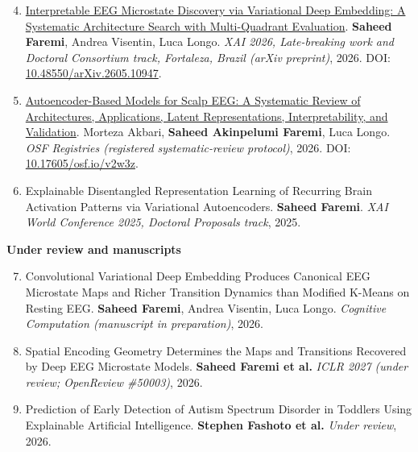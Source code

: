 \documentclass[11pt]{article}
\begin{document}
\begin{enumerate}
  \setcounter{enumi}{3}
  \setlength{\itemsep}{2pt}
  \item \href{https://arxiv.org/abs/2605.10947}{Interpretable EEG Microstate Discovery via Variational Deep Embedding: A Systematic Architecture Search with Multi-Quadrant Evaluation}.\newline
  \textbf{Saheed Faremi}, Andrea Visentin, Luca Longo.\newline
  \emph{XAI 2026, Late-breaking work and Doctoral Consortium track, Fortaleza, Brazil (arXiv preprint)}, 2026. DOI: \href{https://doi.org/10.48550/arXiv.2605.10947}{10.48550/arXiv.2605.10947}.

  \item \href{https://osf.io/v2w3z}{Autoencoder-Based Models for Scalp EEG: A Systematic Review of Architectures, Applications, Latent Representations, Interpretability, and Validation}.\newline
  Morteza Akbari, \textbf{Saheed Akinpelumi Faremi}, Luca Longo.\newline
  \emph{OSF Registries (registered systematic-review protocol)}, 2026. DOI: \href{https://doi.org/10.17605/osf.io/v2w3z}{10.17605/osf.io/v2w3z}.

  \item Explainable Disentangled Representation Learning of Recurring Brain Activation Patterns via Variational Autoencoders.\newline
  \textbf{Saheed Faremi}.\newline
  \emph{XAI World Conference 2025, Doctoral Proposals track}, 2025.
\end{enumerate}
\vspace{5pt}
\noindent\textbf{Under review and manuscripts}\par
\vspace{2pt}
\begin{enumerate}
  \setcounter{enumi}{6}
  \setlength{\itemsep}{2pt}
  \item Convolutional Variational Deep Embedding Produces Canonical EEG Microstate Maps and Richer Transition Dynamics than Modified K-Means on Resting EEG.\newline
  \textbf{Saheed Faremi}, Andrea Visentin, Luca Longo.\newline
  \emph{Cognitive Computation (manuscript in preparation)}, 2026.

  \item Spatial Encoding Geometry Determines the Maps and Transitions Recovered by Deep EEG Microstate Models.\newline
  \textbf{Saheed Faremi et al.}\newline
  \emph{ICLR 2027 (under review; OpenReview \#50003)}, 2026.

  \item Prediction of Early Detection of Autism Spectrum Disorder in Toddlers Using Explainable Artificial Intelligence.\newline
  \textbf{Stephen Fashoto et al.}\newline
  \emph{Under review}, 2026.
\end{enumerate}
\end{document}

